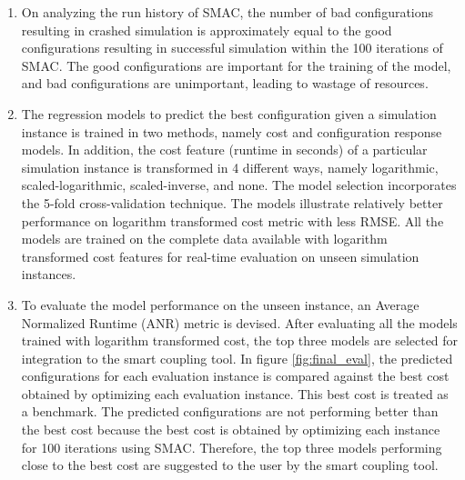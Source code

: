 \begin{enumerate}
\item On analyzing the run history of SMAC, the number of bad configurations resulting in crashed simulation is approximately equal to the good configurations resulting in successful simulation within the 100 iterations of SMAC. The good configurations are important for the training of the model, and bad configurations are unimportant, leading to wastage of resources.


\item The regression models to predict the best configuration given a simulation instance is trained in two methods, namely cost and configuration response models. In addition, the cost feature (runtime in seconds) of a particular simulation instance is transformed in 4 different ways, namely logarithmic, scaled-logarithmic, scaled-inverse, and none. The model selection incorporates the 5-fold cross-validation technique. The models illustrate relatively better performance on logarithm transformed cost metric with less RMSE. All the models are trained on the complete data available with logarithm transformed cost features for real-time evaluation on unseen simulation instances. 

\item To evaluate the model performance on the unseen instance, an Average Normalized Runtime (ANR) metric is devised. After evaluating all the models trained with logarithm transformed cost, the top three models are selected for integration to the smart coupling tool. In figure \ref{fig:final_eval}, the predicted configurations for each evaluation instance is compared against the best cost obtained by optimizing each evaluation instance. This best cost is treated as a benchmark. The predicted configurations are not performing better than the best cost because the best cost is obtained by optimizing each instance for 100 iterations using SMAC. Therefore, the top three models performing close to the best cost are suggested to the user by the smart coupling tool.


\end{enumerate}
